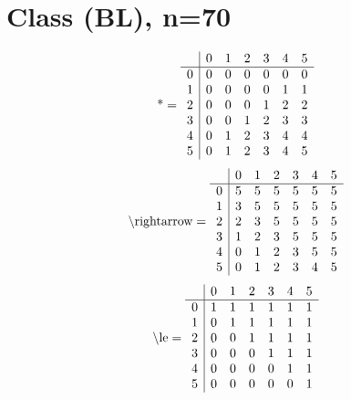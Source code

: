 \documentclass[11pt]{article}
\begin{document}
\section{Class (BL), n=70}
\[\text{*} = 
\begin{array}{r | r r r r r r}
 & 0 & 1 & 2 & 3 & 4 & 5 \\ \hline
0 & 0 & 0 & 0 & 0 & 0 & 0 \\
1 & 0 & 0 & 0 & 0 & 1 & 1 \\
2 & 0 & 0 & 0 & 1 & 2 & 2 \\
3 & 0 & 0 & 1 & 2 & 3 & 3 \\
4 & 0 & 1 & 2 & 3 & 4 & 4 \\
5 & 0 & 1 & 2 & 3 & 4 & 5 \\
\end{array}
\]
\[\text{\textbackslash rightarrow} = 
\begin{array}{r | r r r r r r}
 & 0 & 1 & 2 & 3 & 4 & 5 \\ \hline
0 & 5 & 5 & 5 & 5 & 5 & 5 \\
1 & 3 & 5 & 5 & 5 & 5 & 5 \\
2 & 2 & 3 & 5 & 5 & 5 & 5 \\
3 & 1 & 2 & 3 & 5 & 5 & 5 \\
4 & 0 & 1 & 2 & 3 & 5 & 5 \\
5 & 0 & 1 & 2 & 3 & 4 & 5 \\
\end{array}
\]
\[\text{\textbackslash le} = 
\begin{array}{r | r r r r r r}
 & 0 & 1 & 2 & 3 & 4 & 5 \\ \hline
0 & 1 & 1 & 1 & 1 & 1 & 1 \\
1 & 0 & 1 & 1 & 1 & 1 & 1 \\
2 & 0 & 0 & 1 & 1 & 1 & 1 \\
3 & 0 & 0 & 0 & 1 & 1 & 1 \\
4 & 0 & 0 & 0 & 0 & 1 & 1 \\
5 & 0 & 0 & 0 & 0 & 0 & 1 \\
\end{array}
\]
\end{document}
